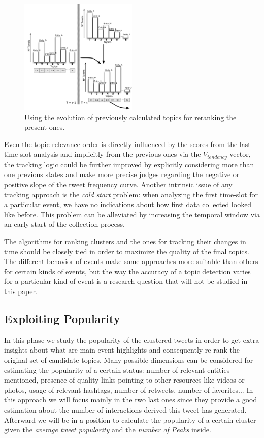 \documentclass{sig-alternate}
\begin{document}
\begin{figure}[h!]
\centering
\includegraphics[width=0.5\textwidth]{figure/Tracking.png}
\caption{Using the evolution of previously calculated topics for reranking the present ones.}
\label{fig:Tracking}
\end{figure}

Even the topic relevance order is directly influenced by the scores from the last time-slot analysis and implicitly from the previous ones via the $V_{tendency}$ vector, the tracking logic could be further improved by explicitly considering more than one previous states and make more precise judges regarding the negative or positive slope of the tweet frequency curve. Another intrinsic issue of any tracking approach is the \textit{cold start} problem: when analyzing the first time-slot for a particular event, we have no indications about how first data collected looked like before. This problem can be alleviated by increasing the temporal window via an early start of the collection process.

The algorithms for ranking clusters and the ones for tracking their changes in time should be closely tied in order to maximize the quality of the final topics. The different behavior of events make some approaches more suitable than others for certain kinds of events, but the way the accuracy of a topic detection varies for a particular kind of event is a research question that will not be studied in this paper.

\subsection{Exploiting Popularity}

In this phase we study the popularity of the clustered tweets in order to get extra insights about what are main event highlights and consequently re-rank the original set of candidate topics. Many possible dimensions can be considered for estimating the popularity of a certain status: number of relevant entities mentioned, presence of quality links pointing to other resources like videos or photos, usage of relevant hashtags, number of retweets, number of favorites... In this approach we will focus mainly in the two last ones since they provide a good estimation about the number of interactions derived this tweet has generated. Afterward we will be in a position to calculate the popularity of a certain cluster given the \textit{average tweet popularity} and the \textit{number of Peaks} inside.
\end{document}
